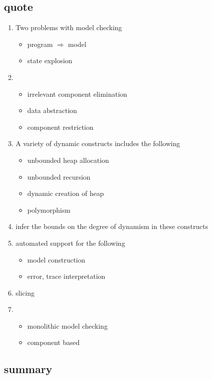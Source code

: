 \documentclass{llncs}
\begin{document}
\subsection{quote}
\begin{enumerate}
\item Two problems with model checking
\begin{itemize}
\item program $\Rightarrow$ model
\item state explosion
\end{itemize}

\item
\begin{itemize}
\item irrelevant component elimination
\item data abstraction
\item component restriction
\end{itemize}

\item
A variety of dynamic constructs includes the following
\begin{itemize}
\item unbounded heap allocation
\item unbounded recursion
\item dynamic creation of heap
\item polymorphism
\end{itemize}

\item infer the bounds on the degree of dynamism in these constructs

\item automated support for the following
\begin{itemize}
\item model construction
\item error, trace interpretation
\end{itemize}

\item slicing

\item
\begin{itemize}
\item monolithic model checking
\item component based
\end{itemize}
\end{enumerate}

\subsection{summary}
\end{document}

